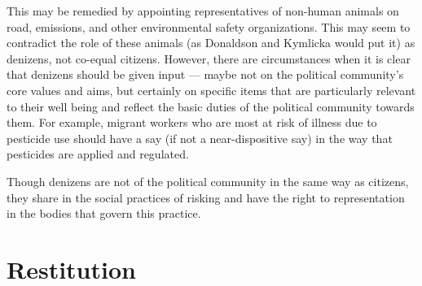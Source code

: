 This may be remedied by appointing representatives of non-human animals on
road, emissions, and other environmental safety organizations. This may seem to
contradict the role of these animals (as Donaldson and Kymlicka would put it)
as denizens, not co-equal citizens. However, there are circumstances when it is
clear that denizens should be given input --- maybe not on the political
community’s core values and aims, but certainly on specific items that are
particularly relevant to their well being and reflect the basic duties of the
political community towards them. For example, migrant workers who are most at
risk of illness due to pesticide use should have a say (if not a
near-dispositive say) in the way that pesticides are applied and regulated.

Though denizens are not of the political community in the same way as citizens,
they share in the social practices of risking and have the right to
representation in the bodies that govern this practice.

\section{Restitution}
